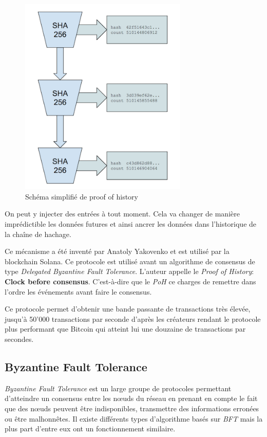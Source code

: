 \begin{figure}[H]
    \centering
    \includegraphics[width=8cm]{images/solana}
    \caption{Schéma simplifié de proof of history}
\end{figure}

On peut y injecter des entrées à tout moment. Cela va changer de manière imprédictible les données futures et ainsi ancrer les données dans l'historique de la chaîne de hachage.

Ce mécanisme a été inventé par Anatoly Yakovenko et est utilisé par la blockchain Solana. Ce protocole est utilisé avant un algorithme de consensus de type \emph{Delegated Byzantine Fault Tolerance}. L'auteur appelle le \emph{Proof of History}: \textbf{Clock before consensus}. C'est-à-dire que le \emph{PoH} ce charges de remettre dans l'ordre les événements avant faire le consensus.

Ce protocole permet d'obtenir une bande passante de transactions très élevée, jusqu'à 50'000 transactions par seconde d'après les créateurs rendant le protocole plus performant que Bitcoin qui atteint lui une douzaine de transactions par secondes.

\subsection{Byzantine Fault Tolerance}

\emph{Byzantine Fault Tolerance} est un large groupe de protocoles permettant d'atteindre un consensus entre les nœuds du réseau en prenant en compte le fait que des nœuds peuvent être indisponibles, transmettre des informations erronées ou être malhonnêtes. Il existe différents types d'algorithme basés sur \emph{BFT} mais la plus part d'entre eux ont un fonctionnement similaire. 

